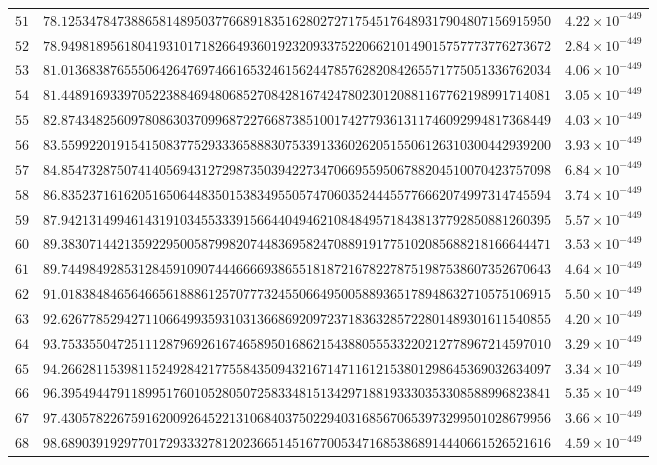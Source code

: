\documentclass[12pt,reqno]{amsart}
\theoremstyle{remark}
\begin{document}
\begin{longtable}{clc}
$51$ & $78.1253478473886581489503776689183516280272717545176489317904807156915950$ & $4.22\times 10^{-449}$ \\
$52$ & $78.9498189561804193101718266493601923209337522066210149015757773776273672$ & $2.84\times 10^{-449}$ \\
$53$ & $81.0136838765550642647697466165324615624478576282084265571775051336762034$ & $4.06\times 10^{-449}$ \\
$54$ & $81.4489169339705223884694806852708428167424780230120881167762198991714081$ & $3.05\times 10^{-449}$ \\
$55$ & $82.8743482560978086303709968722766873851001742779361311746092994817368449$ & $4.03\times 10^{-449}$ \\
$56$ & $83.5599220191541508377529333658883075339133602620515506126310300442939200$ & $3.93\times 10^{-449}$ \\
$57$ & $84.8547328750741405694312729873503942273470669559506788204510070423757098$ & $6.84\times 10^{-449}$ \\
$58$ & $86.8352371616205165064483501538349550574706035244455776662074997314745594$ & $3.74\times 10^{-449}$ \\
$59$ & $87.9421314994614319103455333915664404946210848495718438137792850881260395$ & $5.57\times 10^{-449}$ \\
$60$ & $89.3830714421359229500587998207448369582470889191775102085688218166644471$ & $3.53\times 10^{-449}$ \\
$61$ & $89.7449849285312845910907444666693865518187216782278751987538607352670643$ & $4.64\times 10^{-449}$ \\
$62$ & $91.0183848465646656188861257077732455066495005889365178948632710575106915$ & $5.50\times 10^{-449}$ \\
$63$ & $92.6267785294271106649935931031366869209723718363285722801489301611540855$ & $4.20\times 10^{-449}$ \\
$64$ & $93.7533550472511128796926167465895016862154388055533220212778967214597010$ & $3.29\times 10^{-449}$ \\
$65$ & $94.2662811539811524928421775584350943216714711612153801298645369032634097$ & $3.34\times 10^{-449}$ \\
$66$ & $96.3954944791189951760105280507258334815134297188193330353308588996823841$ & $5.35\times 10^{-449}$ \\
$67$ & $97.4305782267591620092645221310684037502294031685670653973299501028679956$ & $3.66\times 10^{-449}$ \\
$68$ & $98.6890391929770172933327812023665145167700534716853868914440661526521616$ & $4.59\times 10^{-449}$ \\

\end{longtable}
\end{document}
